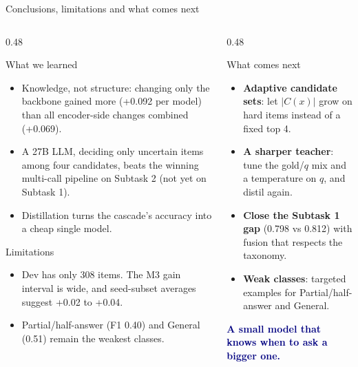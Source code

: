 \documentclass[aspectratio=169,10pt]{beamer}
\begin{document}
\begin{frame}{Conclusions, limitations and what comes next}
  \begin{columns}[T]
    \begin{column}{0.48\textwidth}
      \begin{block}{What we learned}
        \footnotesize
        \begin{itemize}
          \item Knowledge, not structure: changing only the backbone gained more (+0.092 per model) than all encoder-side changes combined (+0.069).
          \item A 27B LLM, deciding only uncertain items among four candidates, beats the winning multi-call pipeline on Subtask 2 (not yet on Subtask 1).
          \item Distillation turns the cascade's accuracy into a cheap single model.
        \end{itemize}
      \end{block}
      \begin{block}{Limitations}
        \footnotesize
        \begin{itemize}
          \item Dev has only 308 items. The M3 gain interval is wide, and seed-subset averages suggest +0.02 to +0.04.
          \item Partial/half-answer (F1 0.40) and General (0.51) remain the weakest classes.
        \end{itemize}
      \end{block}
    \end{column}
    \begin{column}{0.48\textwidth}
      \begin{block}{What comes next}
        \footnotesize
        \begin{itemize}
          \item \textbf{Adaptive candidate sets}: let $|C(x)|$ grow on hard items instead of a fixed top 4.
          \item \textbf{A sharper teacher}: tune the gold/$q$ mix and a temperature on $q$, and distil again.
          \item \textbf{Close the Subtask 1 gap} (0.798 vs 0.812) with fusion that respects the taxonomy.
          \item \textbf{Weak classes}: targeted examples for Partial/half-answer and General.
        \end{itemize}
      \end{block}
      \vspace{2pt}
      \centering\footnotesize\textcolor{navy}{\textbf{A small model that knows when to ask a bigger one.}}
    \end{column}
  \end{columns}
\end{frame}
\end{document}

